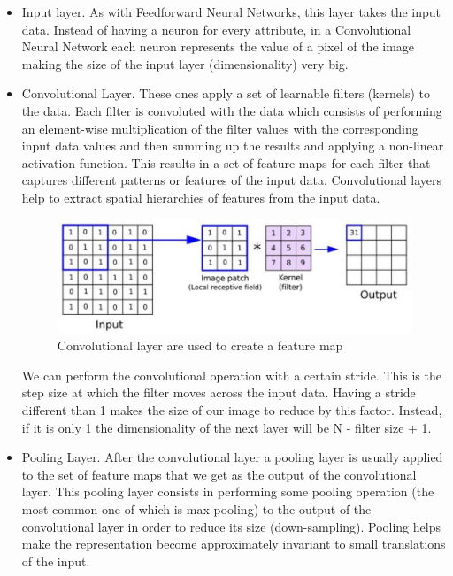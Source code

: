 \begin{itemize}
    \item Input layer. As with Feedforward Neural Networks, this layer takes the input data. Instead of having a neuron for every attribute, in a Convolutional Neural Network each neuron represents the value of a pixel of the image making the size of the input layer (dimensionality) very big.
    \item Convolutional Layer. These ones apply a set of learnable filters (kernels) to the data. Each filter is convoluted with the data which consists of performing an element-wise multiplication of the filter values with the corresponding input data values and then summing up the results and applying a non-linear activation function. This results in a set of feature maps for each filter that captures different patterns or features of the input data. Convolutional layers help to extract spatial hierarchies of features from the input data.

    \begin{figure}[h]
        \centering
        \includegraphics[width=12cm]{Images/convolutional-layer.jpg}
        \caption{Convolutional layer are used to create a feature map}
    \end{figure}

    We can perform the convolutional operation with a certain stride. This is the step size at which the filter moves across the input data. Having a stride different than 1 makes the size of our image to reduce by this factor. Instead, if it is only 1 the dimensionality of the next layer will be N - filter size + 1.

\newpage
    \item Pooling Layer. After the convolutional layer a pooling layer is usually applied to the set of feature maps that we get as the output of the convolutional layer. This pooling layer consists in performing some pooling operation (the most common one of which is max-pooling) to the output of the convolutional layer in order to reduce its size (down-sampling). Pooling helps make the representation become approximately invariant to small translations of the input.


\end{itemize}
